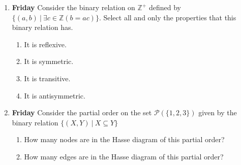 \documentclass[12pt, oneside]{article}
\begin{document}
\begin{enumerate}
\item {\bf Friday} Consider the binary relation on $\mathbb{Z}^+$ defined by $\{(a,b) ~|~ \exists c \in \mathbb{Z} ( b = ac)\}$.
Select all and only the properties that this binary relation has.
\begin{enumerate}
\item It is reflexive.
\item It is symmetric.
\item It is transitive.
\item It is antisymmetric.
\end{enumerate}


\item {\bf Friday} Consider the partial order on the set $\mathcal{P}(\{1,2,3\})$ given by the binary relation 
$\{ (X,Y) ~|~X \subseteq Y \}$
\begin{enumerate}
\item How many nodes are in the Hasse diagram of this partial order?
\item How many edges are in the Hasse diagram of this partial order?
\end{enumerate}

\end{enumerate}
\end{document}
